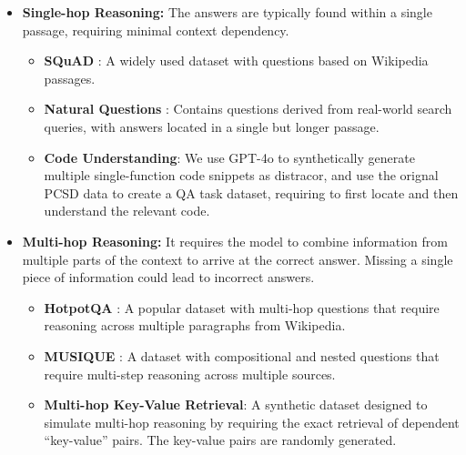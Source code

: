 \begin{itemize}[leftmargin=*,noitemsep,nolistsep]
    \setlength{\itemsep}{2pt}
    \setlength{\parskip}{2pt}
    \setlength{\parsep}{2pt}
        \item \textbf{Single-hop Reasoning:} The answers are typically found within a single passage, requiring minimal context dependency.
\begin{itemize}[leftmargin=*,noitemsep,nolistsep]
\setlength{\itemsep}{2pt}
\setlength{\parskip}{2pt}
\setlength{\parsep}{2pt}

        \item \textbf{SQuAD} \citep{squad}: A widely used dataset with questions based on Wikipedia passages.
        \item \textbf{Natural Questions} \citep{nq}: Contains questions derived from real-world search queries, with answers located in a single but longer passage.
        \item \textbf{Code Understanding}: We use GPT-4o to synthetically generate multiple single-function code snippets as distracor, and use the orignal PCSD \citep{pcsd} data to create a QA task dataset, requiring to first locate and then understand the relevant code. 
    \end{itemize}
    
    \item \textbf{Multi-hop Reasoning:} It requires the model to combine information from multiple parts of the context to arrive at the correct answer. Missing a single piece of information could lead to incorrect answers.
\begin{itemize}[leftmargin=*,noitemsep,nolistsep]
\setlength{\itemsep}{2pt}
\setlength{\parskip}{2pt}
\setlength{\parsep}{2pt}
        \item \textbf{HotpotQA} \citep{yang-etal-2018-hotpotqa}: A popular dataset with multi-hop questions that require reasoning across multiple paragraphs from Wikipedia.
        \item \textbf{MUSIQUE} \citep{musique}: A dataset with compositional and nested questions that require multi-step reasoning across multiple sources.
        \item \textbf{Multi-hop Key-Value Retrieval}: A synthetic dataset designed to simulate multi-hop reasoning by requiring the exact retrieval of dependent ``key-value'' pairs. The key-value pairs are randomly generated.
    \end{itemize}
\end{itemize}

